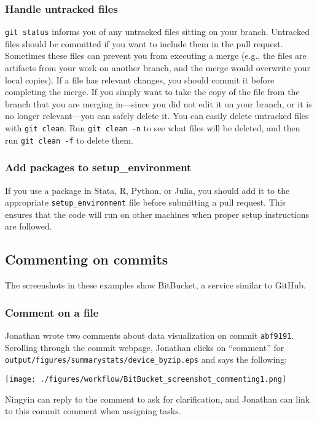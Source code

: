 \subsubsection{Handle untracked files}
\texttt{git status} informs you of any untracked files sitting on your branch.
Untracked files should be committed if you want to include them in the pull request.
Sometimes these files can prevent you from executing a merge
(e.g., the files are artifacts from your work on another branch, and
the merge would overwrite your local copies).
If a file has relevant changes, you should commit it before completing the merge.
If you simply want to take the copy of the file from the branch that you are merging
in---since you did not edit it on your branch, or it is no longer relevant---you
can safely delete it.
You can easily delete untracked files with \texttt{git clean}.
Run \texttt{git clean -n} to see what files will be deleted,
and then run \texttt{git clean -f} to delete them.

\subsubsection{Add packages to setup\_environment}
If you use a package in Stata, R, Python, or Julia,
you should add it to the appropriate \texttt{setup\_environment} file before
submitting a pull request.
This ensures that the code will run on other machines when proper setup
instructions are followed.

\subsection{Commenting on commits}

The screenshots in these examples show BitBucket, a service similar to GitHub.

\subsubsection{Comment on a file}
Jonathan wrote two comments about data visualization on commit \texttt{abf9191}.
Scrolling through the commit webpage, Jonathan clicks on ``comment'' for \texttt{output/figures/summarystats/device\_byzip.eps} and says the following:
\begin{center}\texttt{[image: ./figures/workflow/BitBucket\_screenshot\_commenting1.png]}\end{center}
Ningyin can reply to the comment to ask for clarification, and Jonathan can link to this commit comment when assigning tasks.

